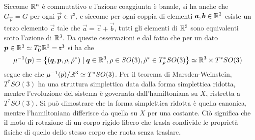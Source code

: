 Siccome $\mathbb{R}^{n}$ è commutativo e l'azione coaggiunta è banale, si ha anche che $G_{\vec{p}} = G$ per ogni $\vec{p} \in \mathfrak{r}^3$, e siccome per ogni coppia di elementi $\boldsymbol{a}, \boldsymbol{b} \in \mathbb{R}^3$ esiste un terzo elemento $\vec{c}$ tale che $\vec{a} = \vec{c} + \vec{b}$, tutti gli elementi di $\mathbb{R}^3$ sono equivalenti sotto l'azione di $\mathbb{R}^3$. Da queste osservazioni e dal fatto che per un dato $\boldsymbol{p} \in \mathbb{R}^3 \simeq T^*_{\boldsymbol{0}} \mathbb{R}^3 = \mathfrak{r}^3$ si ha che
\begin{equation}
\mu^{-1}(\boldsymbol{p}) = \big\lbrace(\boldsymbol{q},\boldsymbol{p}, \rho, \dot{\rho}^*) \mid \boldsymbol{q}\in \mathbb{R}^3, \rho \in SO(3), \dot{\rho}^* \in T^*_{\rho} SO(3)\big\rbrace \simeq \mathbb{R}^3 \times T^*SO(3)
\end{equation} 
segue che che $\mu^{-1}(p)/\mathbb{R}^3 \simeq T^*SO(3)$. Per il teorema di Marsden-Weinstein, $T^* SO(3)$ ha una struttura simplettica data dalla forma simplettica ridotta, mentre l'evoluzione del sistema è governata dall'hamiltoniana su $X$, ristretta a $T^* SO(3)$. Si può dimostrare che la forma simplettica ridotta è quella canonica, mentre l'hamiltoniana differisce da quella su $X$ per una costante. Ciò significa che il moto di rotazione di un corpo rigido libero che trasla condivide le proprietà fisiche di quello dello stesso corpo che ruota senza traslare.


